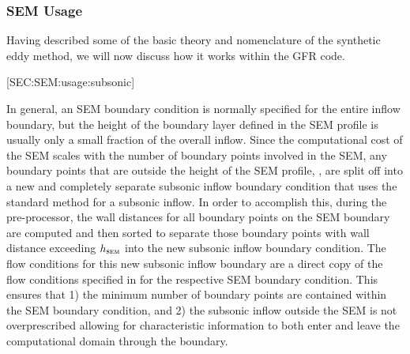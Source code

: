 \subsubsection{SEM Usage}\label{SEC:SEM:usage}

Having described some of the basic theory and nomenclature of the
synthetic eddy method, we will now discuss how it works within the
GFR code.


[SEC:SEM:usage:subsonic]

In general, an SEM boundary condition is normally specified for the entire
inflow boundary, but the height of the boundary layer defined in the SEM profile
is usually only a small fraction of the overall inflow.
%
Since the computational cost of the SEM scales with the number of boundary
points involved in the SEM, any boundary points that are outside the height of
the SEM profile, \hSEM, are split off into a new and completely separate
subsonic inflow boundary condition that uses the standard method for a subsonic
inflow.
%
In order to accomplish this, during the pre-processor, the wall distances for
all boundary points on the SEM boundary are computed and then sorted to separate
those boundary points with wall distance exceeding $h_{\textsc{sem}}$ into the new subsonic
inflow boundary condition.
%
The flow conditions for this new subsonic inflow boundary are a direct copy of
the flow conditions specified in
for the respective SEM boundary condition.
%
This ensures that 1) the minimum number of boundary points are contained within
the SEM boundary condition, and 2) the subsonic inflow outside the SEM is not
overprescribed allowing for characteristic information to both enter and leave
the computational domain through the boundary.


